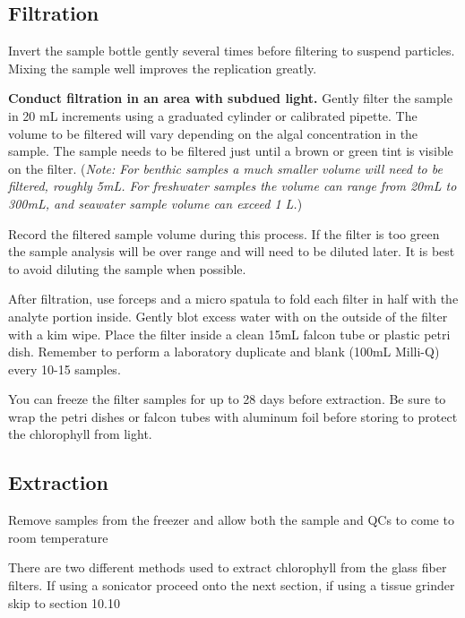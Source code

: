 \documentclass[12pt]{../SOP3_alpha}
\begin{document}

\subsection*{Filtration}
\NP Invert the sample bottle gently several times before filtering to suspend particles. Mixing the sample well improves the replication greatly.

\NP \textbf{Conduct filtration in an area with subdued light.} Gently filter the sample in 20 mL increments using a graduated cylinder or calibrated pipette. The volume to be filtered will vary depending on the algal concentration in the sample. The sample needs to be filtered just until a brown or green tint is visible on the filter. ({\small \textit{Note: For benthic samples a much smaller volume will need to be filtered, roughly 5mL. For freshwater samples the volume can range from 20mL to 300mL, and seawater sample volume can exceed 1 L.}})

\NP Record the filtered sample volume during this process. If the filter is too green the sample analysis will be over range and will need to be diluted later.  It is best to avoid diluting the sample when possible. 

\NP After filtration, use forceps and a micro spatula to fold each filter in half with the analyte portion inside. Gently blot excess water with on the outside of the filter with a kim wipe. Place the filter inside a clean 15mL falcon tube or plastic petri dish.  
\NP Remember to perform a laboratory duplicate and blank (100mL Milli-Q) every 10-15 samples.

\NP You can freeze the filter samples for up to 28 days before extraction. Be sure to wrap the petri dishes or falcon tubes with aluminum foil before storing to protect the chlorophyll from light. 

\subsection*{Extraction}

\NP Remove samples from the freezer and allow both the sample and QCs to come to room temperature

\NP There are two different methods used to extract chlorophyll from the glass fiber filters. If using a sonicator proceed onto the next section, if using a tissue grinder skip to section 10.10
\end{document}
